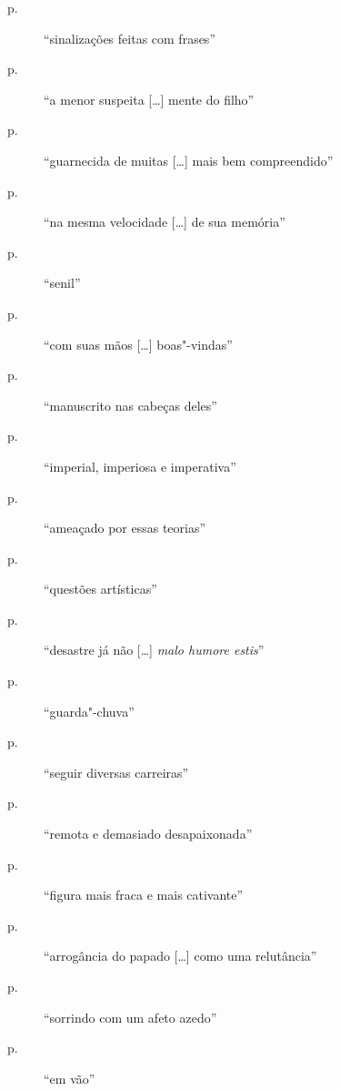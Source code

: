 \begin{description}
\item[p.~\pageref{sinalizacoes"-feitas}]  ``sinalizações feitas com frases''

\item[p.~\pageref{a"-menor}]  ``a menor suspeita [\ldots] mente do filho''

\item[p.~\pageref{guarnecida"-de}]  ``guarnecida de muitas [\ldots] mais bem compreendido''

\item[p.~\pageref{na"-mesma}]  ``na mesma velocidade [\ldots] de sua memória''

\item[p.~\pageref{senil}]  ``senil''

\item[p.~\pageref{com"-suas}]  ``com suas mãos [\ldots] boas"-vindas''

\item[p.~\pageref{manuscrito"-nas}]  ``manuscrito nas cabeças deles''

\item[p.~\pageref{imperial"-imperiosa}]  ``imperial, imperiosa e imperativa''

\item[p.~\pageref{ameacado"-por}]  ``ameaçado por essas teorias''

\item[p.~\pageref{questoes"-artisticas}]  ``questões artísticas''

\item[p.~\pageref{desastre"-ja}]  ``desastre já não [\ldots] \textit{malo humore estis}''

\item[p.~\pageref{guarda"-chuva}]  ``guarda"-chuva''

\item[p.~\pageref{seguir"-diversas}]  ``seguir diversas carreiras''

\item[p.~\pageref{remota"-e}]  ``remota e demasiado desapaixonada''

\item[p.~\pageref{figura"-mais}]  ``figura mais fraca e mais cativante''

\item[p.~\pageref{arrogancia"-do}]  ``arrogância do papado [\ldots] como uma relutância''

\item[p.~\pageref{sorrindo"-com}]  ``sorrindo com um afeto azedo''

\item[p.~\pageref{em"-vao}]  ``em vão''


\end{description}
